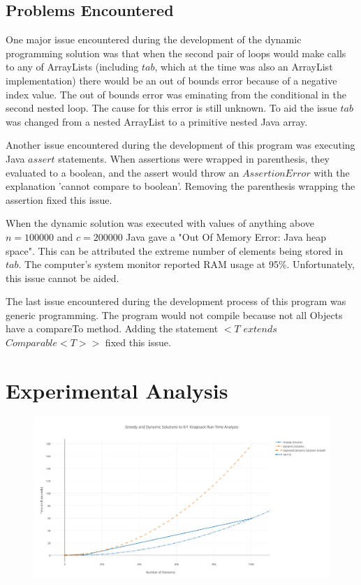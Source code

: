 \documentclass[onecolumn, 12pt, article]{IEEEtran}
\numberwithin{case}{problem}
\numberwithin{condition}{problem}
\numberwithin{condition}{subsection}
\numberwithin{definition}{section}
\theoremstyle{remark}
\numberwithin{question}{problem}
\theoremstyle{plain}
\numberwithin{answer}{problem}
\numberwithin{solution}{section}
\numberwithin{equation}{section}%
\begin{document}
\subsection{Problems Encountered}
One major issue encountered during the development of the dynamic programming solution was that when the second pair of loops would make calls to any of ArrayLists (including $tab$, which at the time was also an ArrayList implementation) there would be an out of bounds error because of a negative index value. The out of bounds error was eminating from the conditional in the second nested loop. The cause for this error is still unknown. To aid the issue $tab$ was changed from a nested ArrayList to a primitive nested Java array. 

Another issue encountered during the development of this program was executing Java $assert$ statements. When assertions were wrapped in parenthesis, they evaluated to a boolean, and the assert would throw an $AssertionError$ with the explanation 'cannot compare to boolean'. Removing the parenthesis wrapping the assertion fixed this issue.

When the dynamic solution was executed with values of anything above $n = 100000$ and $c = 200000$ Java gave a "Out Of Memory Error: Java heap space". This can be attributed the extreme number of elements being stored in $tab$. The computer's system monitor reported RAM usage at 95\%. Unfortunately, this issue cannot be aided. 

The last issue encountered during the development process of this program was generic programming. The program would not compile because not all Objects have a compareTo method. Adding the statement $<T$ $extends$ $Comparable<T>>$ fixed this issue. \cite{erik}


\section{Experimental Analysis}
\begin{figure}[!]
\begin{center}
\includegraphics[scale=.55]{test-results.pdf}
\end{center}
\label{fig:runtime}
\end{figure}
\end{document}
